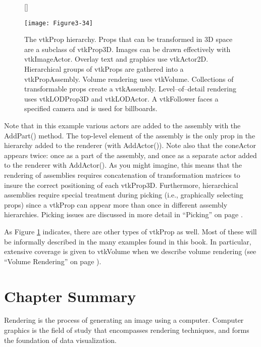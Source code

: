 \begin{figure}[!htb]
[\FBwidth]
{\caption{The vtkProp hierarchy.
Props that can be transformed in 3D space are a subclass of
vtkProp3D. Images can be drawn effectively with vtkImageActor.
Overlay text and graphics use vtkActor2D. Hierarchical groups
of vtkProps are gathered into a vtkPropAssembly. Volume rendering
uses vtkVolume. Collections of transformable props create a
vtkAssembly. Level--of--detail rendering uses vtkLODProp3D and
vtkLODActor. A vtkFollower faces a specified camera
and is used for billboards.}\label{fig:Figure3-34}}
{\texttt{[image: Figure3-34]}}
\end{figure}

Note that in this example various actors are added to the assembly with the AddPart() method. The top-level element of the assembly is the only prop in the hierarchy added to the renderer (with AddActor()). Note also that the coneActor appears twice: once as a part of the assembly, and once as a separate actor added to the renderer with AddActor(). As you might imagine, this means that the rendering of assemblies requires concatenation of transformation matrices to insure the correct positioning of each vtkProp3D. Furthermore, hierarchical assemblies require special treatment during picking (i.e., graphically selecting props) since a vtkProp can appear more than once in different assembly hierarchies. Picking issues are discussed in more detail in ``Picking'' on page \pageref{subsec:picking}.

As Figure \ref{fig:Figure3-34} indicates, there are other types of vtkProp as well. Most of these will be informally described in the many examples found in this book. In particular, extensive coverage is given to vtkVolume when we describe volume rendering (see ``Volume Rendering'' on page \pageref{sec:volume_rendering}).

\section{Chapter Summary}

Rendering is the process of generating an image using a computer. Computer graphics is the field of study that encompasses rendering techniques, and forms the foundation of data visualization.

